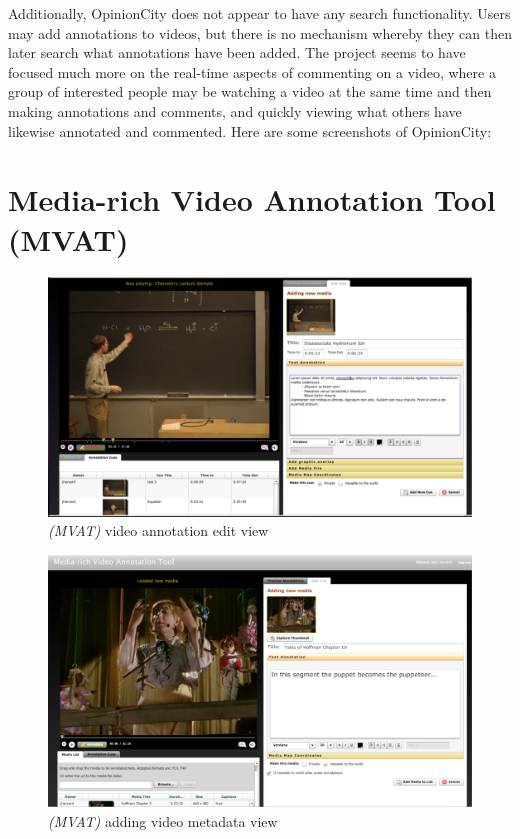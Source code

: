 Additionally, OpinionCity does not appear to have any search functionality.  Users may add annotations to videos, but there is no mechanism whereby they can then later search what annotations have been added.  The project seems to have focused much more on the real-time aspects of commenting on a video, where a group of interested people may be watching a video at the same time and then making annotations and comments, and quickly viewing what others have likewise annotated and commented.  Here are some screenshots of OpinionCity:



\section{Media-rich Video Annotation Tool (MVAT)}
\label{sec:priorwork:media-rich-video-annotation-tool}

\begin{figure}[!ht]
	\includegraphics[width=\textwidth]{gfx/mvat/mvat-annotation-edit-view.png}
	\caption{\textit{(MVAT)} video annotation edit view} 
	\label{fig:mvat:video-annotation-edit-view}
	\center{\noindent\rule{0.75\textwidth}{0.4pt}}
\end{figure} 

\begin{figure}[!ht]
	\includegraphics[width=\textwidth]{gfx/mvat/mvat-loading-video-adding-metadata.png}
	\caption{\textit{(MVAT)} adding video metadata view} 
	\label{fig:mvat:adding-video-metadata}
	\center{\noindent\rule{0.75\textwidth}{0.4pt}}
\end{figure} 

